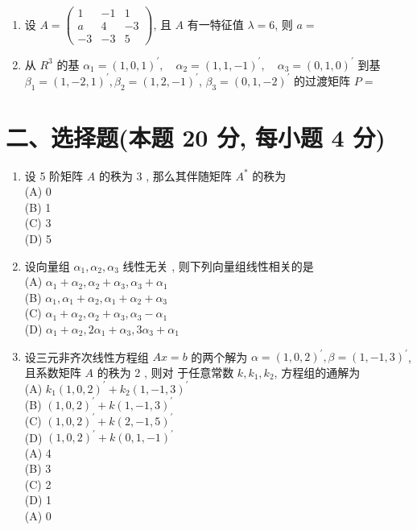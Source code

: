 \documentclass[10pt]{article}
\begin{document}
{\begin{enumerate}
  \item  设  $A=\left(\begin{array}{ccc}1 & -1 & 1 \\ a & 4 & -3 \\ -3 & -3 & 5\end{array}\right)$,  且  $A$  有一特征值  $\lambda=6$,  则  $a=$

  \item  从  $R^{3}$  的基  $\alpha_{1}=(1,0,1)^{\prime}, \quad \alpha_{2}=(1,1,-1)^{\prime}, \quad \alpha_{3}=(0,1,0)^{\prime}$  到基  $\beta_{1}=(1,-2,1)^{\prime}, \beta_{2}=(1,2,-1)^{\prime}$, $\beta_{3}=(0,1,-2)^{\prime}$  的过渡矩阵  $P=$

\end{enumerate}
\section{二、选择题(本题 20 分, 每小题 4 分)}
\begin{enumerate}
  \item  设  5  阶矩阵  $A$  的秩为  3 ,  那么其伴随矩阵  $A^{*}$  的秩为 \\
(A) 0\\
(B) 1\\
(C) 3\\
(D) 5

  \item  设向量组  $\alpha_{1}, \alpha_{2}, \alpha_{3}$  线性无关 ,  则下列向量组线性相关的是 \\
(A) $\alpha_{1}+\alpha_{2}, \alpha_{2}+\alpha_{3}, \alpha_{3}+\alpha_{1}$\\
(B) $\alpha_{1}, \alpha_{1}+\alpha_{2}, \alpha_{1}+\alpha_{2}+\alpha_{3}$\\
(C) $\alpha_{1}+\alpha_{2}, \alpha_{2}+\alpha_{3}, \alpha_{3}-\alpha_{1}$\\
(D) $\alpha_{1}+\alpha_{2}, 2 \alpha_{1}+\alpha_{3}, 3 \alpha_{3}+\alpha_{1}$

  \item  设三元非齐次线性方程组  $A x=b$  的两个解为  $\alpha=(1,0,2)^{\prime}, \beta=(1,-1,3)^{\prime}$,  且系数矩阵  $A$  的秩为  2 ,  则对   于任意常数  $k, k_{1}, k_{2}$,  方程组的通解为 \\
(A) $k_{1}(1,0,2)^{\prime}+k_{2}(1,-1,3)^{\prime}$\\
(B) $(1,0,2)^{\prime}+k(1,-1,3)^{\prime}$\\
(C) $(1,0,2)^{\prime}+k(2,-1,5)^{\prime}$\\
(D) $(1,0,2)^{\prime}+k(0,1,-1)^{\prime}$\\
(A) 4\\
(B) 3\\
(C) 2\\
(D) 1\\
(A) 0


\end{enumerate}}
\end{document}
